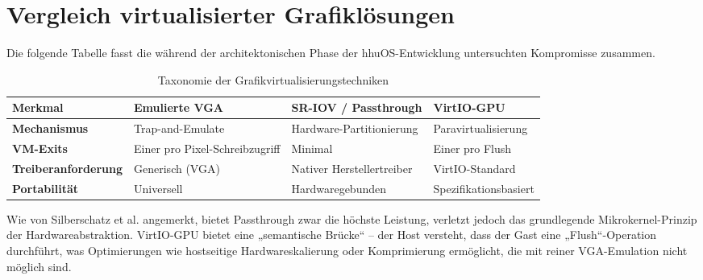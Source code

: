 \section{Vergleich virtualisierter Grafiklösungen}
Die folgende Tabelle fasst die während der architektonischen Phase der hhuOS-Entwicklung untersuchten Kompromisse zusammen.
\begin{table}[H]
\centering
\caption{Taxonomie der Grafikvirtualisierungstechniken}
\begin{tabular}{l p{3cm} p{3.5cm} p{3cm}}
\toprule
\textbf{Merkmal} & \textbf{Emulierte VGA} & \textbf{SR-IOV / Passthrough} & \textbf{VirtIO-GPU} \\ \midrule
\textbf{Mechanismus} & Trap-and-Emulate & Hardware-Partitionierung & Paravirtualisierung \\
\textbf{VM-Exits} & Einer pro Pixel-Schreibzugriff & Minimal & Einer pro Flush \\
\textbf{Treiberanforderung} & Generisch (VGA) & Nativer Herstellertreiber & VirtIO-Standard \\
\textbf{Portabilität} & Universell & Hardwaregebunden & Spezifikationsbasiert \\ \bottomrule
\end{tabular}
\end{table}

Wie von Silberschatz et al. \cite{Silberschatz2021} angemerkt, bietet Passthrough zwar die höchste Leistung, verletzt jedoch das grundlegende Mikrokernel-Prinzip der Hardwareabstraktion. VirtIO-GPU bietet eine „semantische Brücke“ – der Host versteht, dass der Gast eine „Flush“-Operation durchführt, was Optimierungen wie hostseitige Hardwareskalierung oder Komprimierung ermöglicht, die mit reiner VGA-Emulation nicht möglich sind.
\newpage